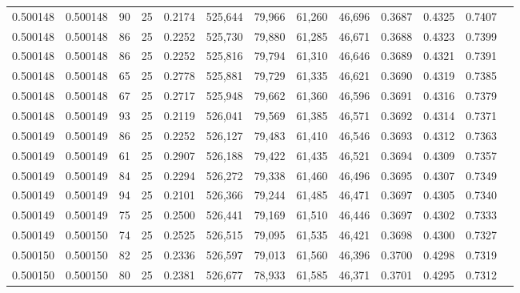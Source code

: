 \begin{tabular}{rrrrrrrrrrrrr}
0.500148 & 0.500148 &    90 &  25 &                                     0.2174 & 525,644 &  79,966 &  61,260 &  46,696 & 0.3687 & 0.4325 & 0.7407 \\
0.500148 & 0.500148 &    86 &  25 &                                     0.2252 & 525,730 &  79,880 &  61,285 &  46,671 & 0.3688 & 0.4323 & 0.7399 \\
0.500148 & 0.500148 &    86 &  25 &                                     0.2252 & 525,816 &  79,794 &  61,310 &  46,646 & 0.3689 & 0.4321 & 0.7391 \\
0.500148 & 0.500148 &    65 &  25 &                                     0.2778 & 525,881 &  79,729 &  61,335 &  46,621 & 0.3690 & 0.4319 & 0.7385 \\
0.500148 & 0.500148 &    67 &  25 &                                     0.2717 & 525,948 &  79,662 &  61,360 &  46,596 & 0.3691 & 0.4316 & 0.7379 \\
0.500148 & 0.500149 &    93 &  25 &                                     0.2119 & 526,041 &  79,569 &  61,385 &  46,571 & 0.3692 & 0.4314 & 0.7371 \\
0.500149 & 0.500149 &    86 &  25 &                                     0.2252 & 526,127 &  79,483 &  61,410 &  46,546 & 0.3693 & 0.4312 & 0.7363 \\
0.500149 & 0.500149 &    61 &  25 &                                     0.2907 & 526,188 &  79,422 &  61,435 &  46,521 & 0.3694 & 0.4309 & 0.7357 \\
0.500149 & 0.500149 &    84 &  25 &                                     0.2294 & 526,272 &  79,338 &  61,460 &  46,496 & 0.3695 & 0.4307 & 0.7349 \\
0.500149 & 0.500149 &    94 &  25 &                                     0.2101 & 526,366 &  79,244 &  61,485 &  46,471 & 0.3697 & 0.4305 & 0.7340 \\
0.500149 & 0.500149 &    75 &  25 &                                     0.2500 & 526,441 &  79,169 &  61,510 &  46,446 & 0.3697 & 0.4302 & 0.7333 \\
0.500149 & 0.500150 &    74 &  25 &                                     0.2525 & 526,515 &  79,095 &  61,535 &  46,421 & 0.3698 & 0.4300 & 0.7327 \\
0.500150 & 0.500150 &    82 &  25 &                                     0.2336 & 526,597 &  79,013 &  61,560 &  46,396 & 0.3700 & 0.4298 & 0.7319 \\
0.500150 & 0.500150 &    80 &  25 &                                     0.2381 & 526,677 &  78,933 &  61,585 &  46,371 & 0.3701 & 0.4295 & 0.7312 \\

\end{tabular}
